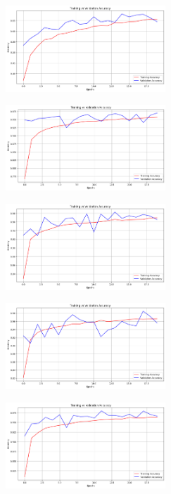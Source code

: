 \begin{multicols}{2}
\includegraphics[width=0.45\textwidth]{Assets/validation_accuracy/MOBILENETV2.png}

\vspace{0.8cm}

\includegraphics[width=0.45\textwidth]{Assets/validation_accuracy/MobileNetV3Large.png}

\vspace{0.8cm}

\includegraphics[width=0.45\textwidth]{Assets/validation_accuracy/ResNet50.png}

\vspace{0.8cm}

\includegraphics[width=0.45\textwidth]{Assets/validation_accuracy/RESNET101.png}

\vspace{0.8cm}

\includegraphics[width=0.45\textwidth]{Assets/validation_accuracy/RESNET152.png}


\end{multicols}
